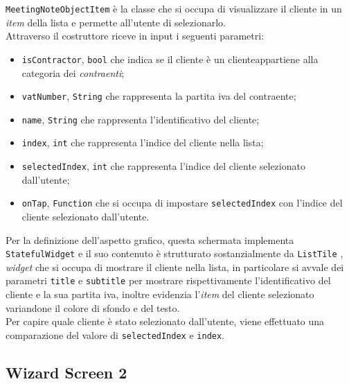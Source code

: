 \lstinline{MeetingNoteObjectItem} è la classe che si occupa di visualizzare il cliente in un \emph{item} della lista e permette all'utente di selezionarlo. \\
Attraverso il costruttore riceve in input i seguenti parametri:
\begin{itemize}
    \item \lstinline{isContractor}, \lstinline{bool} che indica se il cliente è un \gls{cliente}\glsoccur appartiene alla categoria dei \emph{contraenti};
    \item \lstinline{vatNumber}, \lstinline{String} che rappresenta la partita iva del contraente;
    \item \lstinline{name}, \lstinline{String} che rappresenta l'identificativo del cliente;
    \item \lstinline{index}, \lstinline{int} che rappresenta l'indice del cliente nella lista;
    \item \lstinline{selectedIndex}, \lstinline{int} che rappresenta l'indice del cliente selezionato dall'utente;
    \item \lstinline{onTap}, \lstinline{Function} che si occupa di impostare \lstinline{selectedIndex} con l'indice del cliente selezionato dall'utente.
\end{itemize}
Per la definizione dell'aspetto grafico, questa schermata implementa \lstinline{StatefulWidget} e il suo contenuto è strutturato sostanzialmente da \lstinline{ListTile} \cite{site:list-tile}, \emph{widget} che si occupa di mostrare il cliente nella lista, in particolare si avvale dei parametri \lstinline{title} e \lstinline{subtitle} per mostrare rispettivamente l'identificativo del cliente e la sua partita iva, inoltre evidenzia l'\emph{item} del cliente selezionato variandone il colore di sfondo e del testo.\\
Per capire quale cliente è stato selezionato dall'utente, viene effettuato una comparazione del valore di \lstinline{selectedIndex} e \lstinline{index}.

\subsection{Wizard Screen 2}
\label{subsec:wizard-screen-2}


